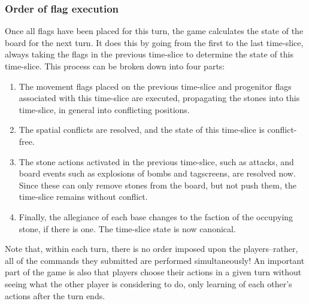 \documentclass[12pt]{article}
\begin{document}
	\subsubsection{Order of flag execution}
	Once all flags have been placed for this turn, the game calculates the state of the board for the next turn. It does this by going from the first to the last time-slice, always taking the flags in the previous time-slice to determine the state of this time-slice. This process can be broken down into four parts:
	\begin{enumerate}
		\item The movement flags placed on the previous time-slice and progenitor flags associated with this time-slice are executed, propagating the stones into this time-slice, in general into conflicting positions.
		\item The spatial conflicts are resolved, and the state of this time-slice is conflict-free.
		\item The stone actions activated in the previous time-slice, such as attacks, and board events such as explosions of bombs and tagscreens, are resolved now. Since these can only remove stones from the board, but not push them, the time-slice remains without conflict.
		\item Finally, the allegiance of each base changes to the faction of the occupying stone, if there is one. The time-slice state is now canonical.
	\end{enumerate}
	Note that, within each turn, there is no order imposed upon the players--rather, all of the commands they submitted are performed simultaneously! An important part of the game is also that players choose their actions in a given turn without seeing what the other player is considering to do, only learning of each other's actions after the turn ends.
	
\end{document}
